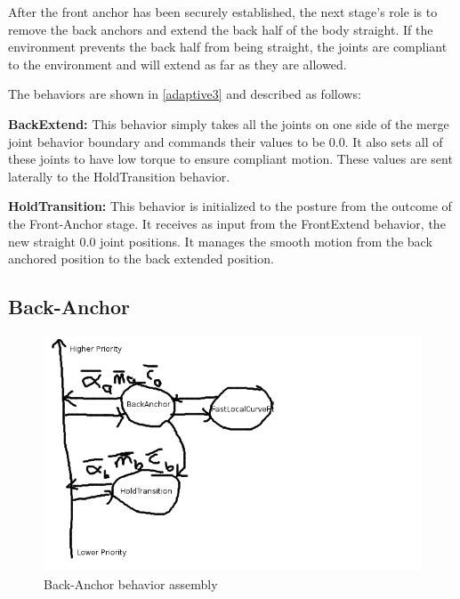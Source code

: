 

After the front anchor has been securely established, the next stage's role is to remove the back anchors and extend the back half of the body straight. If the environment prevents the back half from being straight, the joints are compliant to the environment and will extend as far as they are allowed.

The behaviors are shown in \autoref{adaptive3} and described as follows:

\textbf{BackExtend:}
This behavior simply takes all the joints on one side of the merge joint behavior boundary and commands their values to be 0.0. It also sets all of these joints to have low torque to ensure compliant motion. These values are sent laterally to the HoldTransition behavior.

\textbf{HoldTransition:}
This behavior is initialized to the posture from the outcome of the Front-Anchor stage. It receives as input from the FrontExtend behavior, the new straight 0.0 joint positions. It manages the smooth motion from the back anchored position to the back extended position.

\subsection{Back-Anchor}
\label{back-anchor}

\begin{figure}[htbp]
\centering
\includegraphics[keepaspectratio,width=400pt,height=0.75\textheight]{2_adaptive_4.png}
\caption{Back-Anchor behavior assembly}
\label{adaptive4}
\end{figure}



